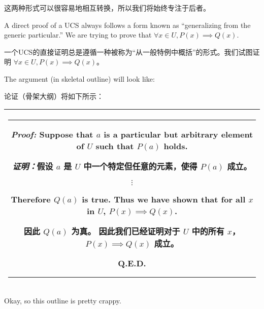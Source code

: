 这两种形式可以很容易地相互转换，所以我们将始终专注于后者。

A direct proof of a UCS
always follows a form known as
``generalizing from the generic particular.''
We are trying to prove that $\forall x \in U, P(x) \implies Q(x)$.

一个UCS的直接证明总是遵循一种被称为“从一般特例中概括”的形式。我们试图证明 $\forall x \in U, P(x) \implies Q(x)$。

The argument (in skeletal outline) will look like:
\medskip

论证（骨架大纲）将如下所示：
\medskip

\begin{center}
      \begin{tabular}{|c|} \hline
            \rule{16pt}{0pt}\begin{minipage}{.75\textwidth}
                                  \rule{0pt}{20pt} {\em Proof:} Suppose that $a$ is a particular but arbitrary element of $U$ such
                                  that $P(a)$ holds.

                                        {\em 证明：}假设 $a$ 是 $U$ 中一个特定但任意的元素，使得 $P(a)$ 成立。
                                  \begin{center}
                        $\vdots$
                  \end{center}

                                  Therefore $Q(a)$ is true. \newline
                                  Thus we have shown that for all $x$ in $U$, $P(x) \implies Q(x)$.\newline

                                  因此 $Q(a)$ 为真。\newline
                                  因此我们已经证明对于 $U$ 中的所有 $x$，$P(x) \implies Q(x)$ 成立。\newline
                                  \rule{0pt}{0pt} \hspace{\fill} Q.E.D.
                                  \rule[-10pt]{0pt}{16pt}
                            \end{minipage} \rule{16pt}{0pt} \\ \hline
      \end{tabular}
\end{center}
\medskip

Okay, so this outline is pretty crappy.

